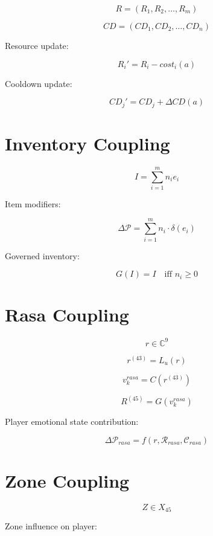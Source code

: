 \[
R = (R_1, R_2, \ldots, R_m)
\]

\[
CD = (CD_1, CD_2, \ldots, CD_n)
\]

Resource update:

\[
R_i' = R_i - cost_i(a)
\]

Cooldown update:

\[
CD_j' = CD_j + \Delta CD(a)
\]


\section*{Inventory Coupling}

\[
I = \sum_{i=1}^{m} n_i e_i
\]

Item modifiers:

\[
\Delta \mathcal{P}
= \sum_{i=1}^{m} n_i \cdot \delta(e_i)
\]

Governed inventory:

\[
G(I) = I \quad \text{iff } n_i \ge 0
\]


\section*{Rasa Coupling}

\[
r \in \mathbb{C}^9
\]

\[
r^{(43)} = L_u(r)
\]

\[
v_k^{rasa} = C(r^{(43)})
\]

\[
R^{(45)} = G(v_k^{rasa})
\]

Player emotional state contribution:

\[
\Delta \mathcal{P}_{rasa}
= f(r, \mathcal{R}_{rasa}, \mathcal{C}_{rasa})
\]


\section*{Zone Coupling}

\[
Z \in X_{45}
\]

Zone influence on player:


